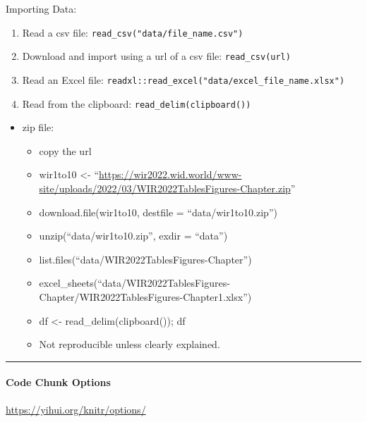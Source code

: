 \documentclass[
]{article}
\providecommand{\tightlist}{%
  \setlength{\itemsep}{0pt}\setlength{\parskip}{0pt}}
\begin{document}
Importing Data:

\begin{enumerate}
\def\labelenumi{\arabic{enumi}.}
\tightlist
\item
  Read a csv file: \texttt{read\_csv("data/file\_name.csv")}
\item
  Download and import using a url of a csv file: \texttt{read\_csv(url)}
\item
  Read an Excel file:
  \texttt{readxl::read\_excel("data/excel\_file\_name.xlsx")}
\item
  Read from the clipboard: \texttt{read\_delim(clipboard())}
\end{enumerate}

\begin{itemize}
\tightlist
\item
  zip file:

  \begin{itemize}
  \item
    copy the url
  \item
    wir1to10 \textless-
    ``\url{https://wir2022.wid.world/www-site/uploads/2022/03/WIR2022TablesFigures-Chapter.zip}''
  \item
    download.file(wir1to10, destfile = ``data/wir1to10.zip'')
  \item
    unzip(``data/wir1to10.zip'', exdir = ``data'')
  \item
    list.files(``data/WIR2022TablesFigures-Chapter'')
  \item
    excel\_sheets(``data/WIR2022TablesFigures-Chapter/WIR2022TablesFigures-Chapter1.xlsx'')
  \item
    df \textless- read\_delim(clipboard()); df
  \item
    Not reproducible unless clearly explained.
  \end{itemize}
\end{itemize}

\begin{center}\rule{0.5\linewidth}{0.5pt}\end{center}

\hypertarget{code-chunk-options}{%
\paragraph{Code Chunk Options}\label{code-chunk-options}}

\url{https://yihui.org/knitr/options/}
\end{document}
